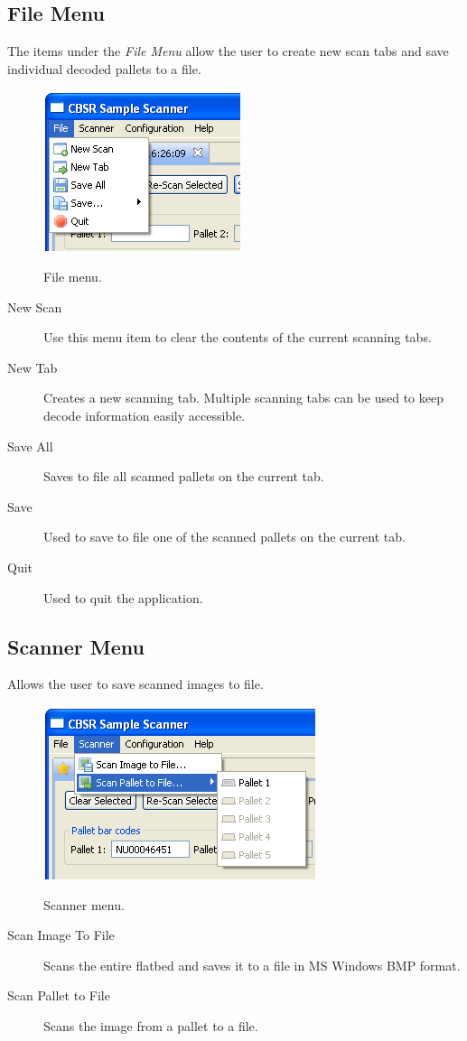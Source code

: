\subsection{File Menu}
The items under the \emph{File Menu} allow the user to create new scan tabs
and save individual decoded pallets to a file.
\begin{figure}[H]
  \centering
  \scalebox{0.5}
	   { \includegraphics*{screenshots/overview/file_menu} }
	   \caption{File menu.}
	   \label{fig:file_menu}
\end{figure}
\begin{description}
\item[New Scan] Use this menu item to clear the contents of the current
  scanning tabs.
\item[New Tab] Creates a new scanning tab. Multiple scanning tabs can be used
  to keep decode information easily accessible.
\item[Save All] Saves to file all scanned pallets on the current tab.
\item[Save] Used to save to file one of the scanned pallets on the current tab.
\item[Quit] Used to quit the application.
\end{description}

\subsection{Scanner Menu}
Allows the user to save scanned images to file.
\begin{figure}[H]
  \centering
  \scalebox{0.5}
	   { \includegraphics*{screenshots/overview/scanner_menu} }
	   \caption{Scanner menu.}
	   \label{fig:scanner_menu}
\end{figure}
\begin{description}
\item[Scan Image To File] Scans the entire flatbed and saves it to a file in MS
  Windows BMP format.
\item[Scan Pallet to File] Scans the image from a pallet to a file.
\end{description}


